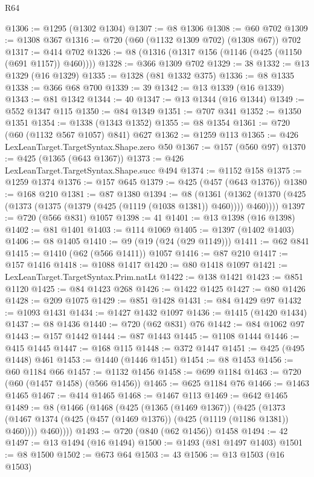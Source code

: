 \begin{lexlean}{R64}
\begin{coremodule}
@1306 := @1295 (@1302 @1304)
@1307 := @8 @1306
@1308 := @60 @702
@1309 := @1308 @367
@1316 := @720 (@60 (@1132 @1309 @702) (@1308 @67)) @702
@1317 := @414 @702
@1326 := @8 (@1316 (@1317 @156 (@1146 (@425 (@1150 (@691 @1157)) @460))))
@1328 := @366 @1309 @702
@1329 := 38
@1332 := @13 @1329 (@16 @1329)
@1335 := @1328 (@81 @1332 @375)
@1336 := @8 @1335
@1338 := @366 @68 @700
@1339 := 39
@1342 := @13 @1339 (@16 @1339)
@1343 := @81 @1342
@1344 := 40
@1347 := @13 @1344 (@16 @1344)
@1349 := @552 @1347 @115
@1350 := @84 @1349
@1351 := @707 @341
@1352 := @1350 @1351
@1354 := @1338 (@1343 @1352)
@1355 := @8 @1354
@1361 := @720 (@60 (@1132 @567 @1057) @841) @627
@1362 := @1259 @113
@1365 := @426 LexLeanTarget.TargetSyntax.Shape.zero @50
@1367 := @157 (@560 @97)
@1370 := @425 (@1365 (@643 @1367))
@1373 := @426 LexLeanTarget.TargetSyntax.Shape.succ @494
@1374 := @1152 @158
@1375 := @1259 @1374
@1376 := @157 @645
@1379 := @425 (@457 (@643 @1376))
@1380 := @168 @210
@1381 := @87 @1380
@1394 := @8
    (@1361 (@1362 (@1370 (@425 (@1373 (@1375 (@1379 (@425 (@1119 (@1038 @1381)) @460)))) @460))))
@1397 := @720 (@566 @831) @1057
@1398 := 41
@1401 := @13 @1398 (@16 @1398)
@1402 := @81 @1401
@1403 := @114 @1069
@1405 := @1397 (@1402 @1403)
@1406 := @8 @1405
@1410 := @9 (@19 (@24 (@29 @1149)))
@1411 := @62 @841
@1415 := @1410 (@62 (@566 @1411)) @1057
@1416 := @87 @210
@1417 := @157 @1416
@1418 := @1088 @1417
@1420 := @80 @1418 @1097
@1421 := LexLeanTarget.TargetSyntax.Prim.natLt
@1422 := @138 @1421
@1423 := @851 @1120
@1425 := @84 @1423 @268
@1426 := @1422 @1425
@1427 := @80 @1426
@1428 := @209 @1075
@1429 := @851 @1428
@1431 := @84 @1429 @97
@1432 := @1093 @1431
@1434 := @1427 @1432 @1097
@1436 := @1415 (@1420 @1434)
@1437 := @8 @1436
@1440 := @720 (@62 @831) @76
@1442 := @84 @1062 @97
@1443 := @157 @1442
@1444 := @87 @1443
@1445 := @1108 @1444
@1446 := @415 @1445
@1447 := @168 @115
@1448 := @372 @1447
@1451 := @425 (@495 @1448) @461
@1453 := @1440 (@1446 @1451)
@1454 := @8 @1453
@1456 := @60 @1184 @66
@1457 := @1132 @1456
@1458 := @699 @1184
@1463 := @720 (@60 (@1457 @1458) (@566 @1456))
@1465 := @625 @1184 @76
@1466 := @1463 @1465
@1467 := @414 @1465
@1468 := @1467 @113
@1469 := @642 @1465
@1489 := @8
    (@1466
      (@1468
        (@425
          (@1365 (@1469 @1367))
          (@425
            (@1373 (@1467 @1374 (@425 (@457 (@1469 @1376)) (@425 (@1119 (@1186 @1381)) @460))))
            @460))))
@1493 := @720 (@840 (@62 @1456)) @1458
@1494 := 42
@1497 := @13 @1494 (@16 @1494)
@1500 := @1493 (@81 @1497 @1403)
@1501 := @8 @1500
@1502 := @673 @64
@1503 := 43
@1506 := @13 @1503 (@16 @1503)

\end{coremodule}
\end{lexlean}
